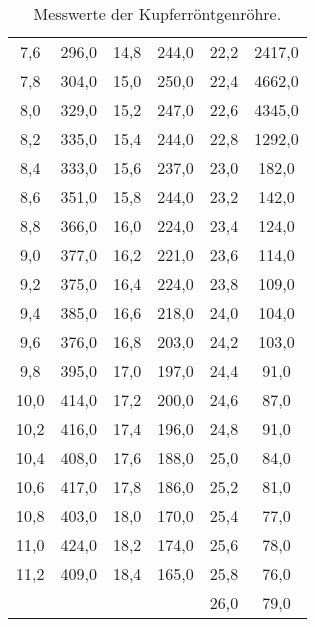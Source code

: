 \begin{table}
\begin{tabular}{c c | c c | c c}
     7,6 & 296,0 & 14,8 & 244,0 & 22,2 & 2417,0 \\
     7,8 & 304,0 & 15,0 & 250,0 & 22,4 & 4662,0 \\
     8,0 & 329,0 & 15,2 & 247,0 & 22,6 & 4345,0 \\
     8,2 & 335,0 & 15,4 & 244,0 & 22,8 & 1292,0 \\
     8,4 & 333,0 & 15,6 & 237,0 & 23,0 &  182,0 \\
     8,6 & 351,0 & 15,8 & 244,0 & 23,2 &  142,0 \\
     8,8 & 366,0 & 16,0 & 224,0 & 23,4 &  124,0 \\
     9,0 & 377,0 & 16,2 & 221,0 & 23,6 &  114,0 \\
     9,2 & 375,0 & 16,4 & 224,0 & 23,8 &  109,0 \\
     9,4 & 385,0 & 16,6 & 218,0 & 24,0 &  104,0 \\
     9,6 & 376,0 & 16,8 & 203,0 & 24,2 &  103,0 \\
     9,8 & 395,0 & 17,0 & 197,0 & 24,4 &   91,0 \\
    10,0 & 414,0 & 17,2 & 200,0 & 24,6 &   87,0 \\
    10,2 & 416,0 & 17,4 & 196,0 & 24,8 &   91,0 \\
    10,4 & 408,0 & 17,6 & 188,0 & 25,0 &   84,0 \\
    10,6 & 417,0 & 17,8 & 186,0 & 25,2 &   81,0 \\
    10,8 & 403,0 & 18,0 & 170,0 & 25,4 &   77,0 \\
    11,0 & 424,0 & 18,2 & 174,0 & 25,6 &   78,0 \\
    11,2 & 409,0 & 18,4 & 165,0 & 25,8 &   76,0 \\
         &       &      &       & 26,0 &   79,0 \\
    \bottomrule
  \end{tabular}
  \caption{Messwerte der Kupferröntgenröhre.}
  \label{tab:Cu}
\end{table}

